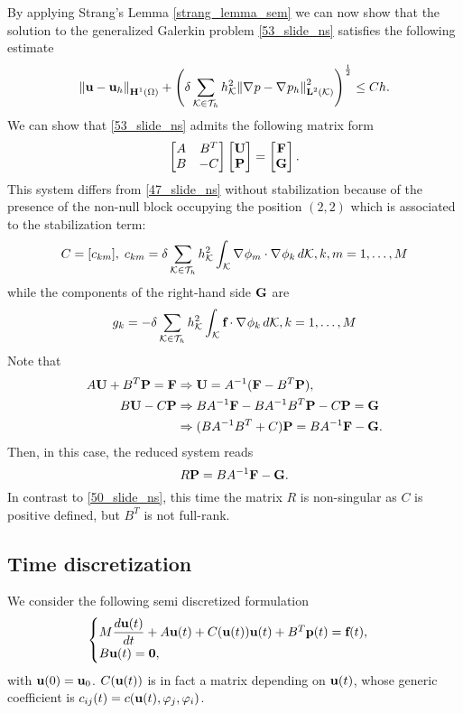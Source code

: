 By applying Strang's Lemma \eqref{strang_lemma_sem} we can now show that the solution to the generalized Galerkin problem \eqref{53_slide_ns} satisfies the following estimate 
\[
    \norm{\textbf{u} - \textbf{u}_h}_{\textbf{H}^1(\Omega)} + \left( \delta \sum_{\mathcal{K}\in\mathcal{T}_h} h^2_{\mathcal{K}} \norm{\nabla\mspace{1mu} p - \nabla\mspace{1mu} p_h}_{\textbf{L}^2(\mathcal{K})}^2 \right)^{\frac{1}{2}} \leq Ch.
\]
We can show that \eqref{53_slide_ns} admits the following matrix form
\begin{equation}
    \left[ \begin{matrix}
        A & B^T \\
        B & -C
    \end{matrix} \right] \left[ \begin{matrix}
        \textbf{U} \\ \textbf{P}
    \end{matrix} \right] = \left[ \begin{matrix}
        \textbf{F} \\ \textbf{G}
    \end{matrix} \right].
    \label{56_slide_ns}
\end{equation}
This system differs from \eqref{47_slide_ns} without stabilization because of the presence of the non-null block occupying the position \((2,2)\) which is associated to the stabilization term:
\[
    C = [c_{km}], \;  c_{km} = \delta \sum_\eit h^2_\element \int_\element \grad \oldphi_m \cdot \grad \oldphi_k \, d\element, k,m = 1,\ldots, M
\]
while the components of the right-hand side \(\textbf{G}\) are 
\[
    g_k = -\delta \sum_\eit h^2_\element \int_\element \vect{f} \cdot \grad \oldphi_k \, d\element, k = 1,\ldots, M
\]
Note that
\begin{align*}
    A\textbf{U} + B^T\textbf{P} = \textbf{F} &\Rightarrow \textbf{U} = A^{-1} (\textbf{F} - B^T\textbf{P}),\\
    B\textbf{U} - C\textbf{P} & \Rightarrow BA^{-1} \textbf{F} - BA^{-1}B^T \textbf{P} -C\textbf{P} = \textbf{G} \\
    &\Rightarrow (BA^{-1}B^T + C)\textbf{P} = BA^{-1} \textbf{F} - \textbf{G}.
\end{align*}
Then, in this case, the reduced system reads 
\[
    R\textbf{P} = BA^{-1} \textbf{F} - \textbf{G}.
\]
In contrast to \eqref{50_slide_ns}, this time the matrix \(R\) is non-singular as \(C\) is positive defined, but \(B^T\) is not full-rank.
\subsection{Time discretization}
We consider the following semi discretized formulation
\begin{equation}
    \begin{cases}
        M\dfrac{d\textbf{u}(t)}{dt} + A\textbf{u}(t) + C(\textbf{u}(t))\textbf{u}(t) + B^T\textbf{p}(t) = \textbf{f}(t) ,\\
        B\textbf{u}(t) = \textbf{0},
        \label{58_slide_ns}
    \end{cases}
\end{equation}
with \(\textbf{u}(0) = \textbf{u}_0\). \(C(\textbf{u}(t))\) is in fact a matrix depending on \(\textbf{u}(t)\), whose generic coefficient is \(c_{ij}(t) = c(\textbf{u}(t), \varphi_j, \varphi_i)\).

